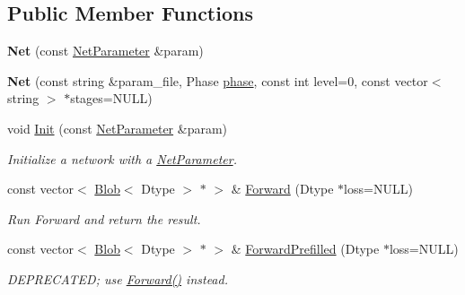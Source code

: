 \subsection*{Public Member Functions}
\begin{DoxyCompactItemize}
\item 
\mbox{\label{classcaffe_1_1_net_a5a5655a49c702c6c4a2f5bd7bf7adf12}} 
{\bfseries Net} (const \mbox{\hyperlink{classcaffe_1_1_net_parameter}{Net\+Parameter}} \&param)
\item 
\mbox{\label{classcaffe_1_1_net_ac42c11d2fa9546421d6c5cd7f83330b3}} 
{\bfseries Net} (const string \&param\+\_\+file, Phase \mbox{\hyperlink{classcaffe_1_1_net_a9418aee447ff6e847fd1a5e7be3d7a44}{phase}}, const int level=0, const vector$<$ string $>$ $\ast$stages=N\+U\+LL)
\item 
\mbox{\label{classcaffe_1_1_net_ae9fcfaabc89165d6c0cb4b14b4c6b584}} 
void \mbox{\hyperlink{classcaffe_1_1_net_ae9fcfaabc89165d6c0cb4b14b4c6b584}{Init}} (const \mbox{\hyperlink{classcaffe_1_1_net_parameter}{Net\+Parameter}} \&param)
\begin{DoxyCompactList}\small\item\em Initialize a network with a \mbox{\hyperlink{classcaffe_1_1_net_parameter}{Net\+Parameter}}. \end{DoxyCompactList}\item 
\mbox{\label{classcaffe_1_1_net_a6f6cf9d40637f7576828d856bb1b1826}} 
const vector$<$ \mbox{\hyperlink{classcaffe_1_1_blob}{Blob}}$<$ Dtype $>$ $\ast$ $>$ \& \mbox{\hyperlink{classcaffe_1_1_net_a6f6cf9d40637f7576828d856bb1b1826}{Forward}} (Dtype $\ast$loss=N\+U\+LL)
\begin{DoxyCompactList}\small\item\em Run Forward and return the result. \end{DoxyCompactList}\item 
\mbox{\label{classcaffe_1_1_net_a12f8c6cf9f453cdbc9fa8149986303c6}} 
const vector$<$ \mbox{\hyperlink{classcaffe_1_1_blob}{Blob}}$<$ Dtype $>$ $\ast$ $>$ \& \mbox{\hyperlink{classcaffe_1_1_net_a12f8c6cf9f453cdbc9fa8149986303c6}{Forward\+Prefilled}} (Dtype $\ast$loss=N\+U\+LL)
\begin{DoxyCompactList}\small\item\em D\+E\+P\+R\+E\+C\+A\+T\+ED; use \mbox{\hyperlink{classcaffe_1_1_net_a6f6cf9d40637f7576828d856bb1b1826}{Forward()}} instead. \end{DoxyCompactList}\item 

\end{DoxyCompactItemize}
